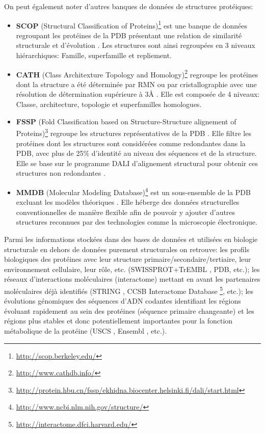 On peut également noter d'autres banques de données de structures protéiques:
\begin{itemize}
  \item \textbf{SCOP} (Structural Classification of Proteins)\footnote{\url{http://scop.berkeley.edu/}} est une banque de données regroupant les protéines de la PDB présentant une relation de similarité structurale et d'évolution \cite{murzin1995scop}. Les structures sont ainsi regroupées en 3 niveaux hiérarchiques: Famille, superfamille et repliement.
  \item \textbf{CATH} (Class Architexture Topology and Homology)\footnote{\url{http://www.cathdb.info/}} regroupe les protéines dont la structure a été déterminée par RMN ou par cristallographie avec une résolution de détermination supérieure à 3\r{A} \cite{sillitoe2015cath}. Elle est composée de 4 niveaux: Classe, architecture, topologie et superfamilles homologues.
  \item \textbf{FSSP} (Fold Classification based on Structure-Structure alignement of Proteins)\footnote{\url{http://protein.hbu.cn/fssp/ekhidna.biocenter.helsinki.fi/dali/start.html}} regroupe les structures représentatives de la PDB \cite{holm1996mapping}. Elle filtre les protéines dont les structures sont considérées comme redondantes dans la PDB, avec plus de 25\% d'identité au niveau des séquences et de la structure. Elle se base sur le programme DALI d'alignement structural pour obtenir ces structures non redondantes \cite{holm1998touring}.
  \item \textbf{MMDB} (Molecular Modeling Database)\footnote{\url{http://www.ncbi.nlm.nih.gov/structure/}} est un sous-ensemble de la PDB excluant les modèles théoriques \cite{madej2014mmdb}. Elle héberge des données structurelles conventionnelles de manière flexible afin de pouvoir y ajouter d'autres structures reconnues par des technologies comme la microscopie électronique.
\end{itemize}

Parmi les informations stockées dans des bases de données et utilisées en biologie structurale en dehors de données purement structurales on retrouve: les profils biologiques des protéines avec leur structure primaire/secondaire/tertiaire, leur environnement cellulaire, leur rôle, etc. (SWISSPROT+TrEMBL \cite{boeckmann2003swiss}, PDB, etc.); les réseaux d'interactions moléculaires (interactome) mettant en avant les partenaires moléculaires déjà identifiés (STRING \cite{Snel15092000}, CCSB Interactome Database \footnote{\url{http://interactome.dfci.harvard.edu/}}, etc.); les évolutions génomiques des séquences d'ADN codantes identifiant les régions évoluant rapidement au sein des protéines (séquence primaire changeante) et les régions plus stables et donc potentiellement importantes pour la fonction métabolique de la protéine (USCS \cite{kent2002human}, Ensembl \cite{hubbard2002ensembl}, etc.). 



